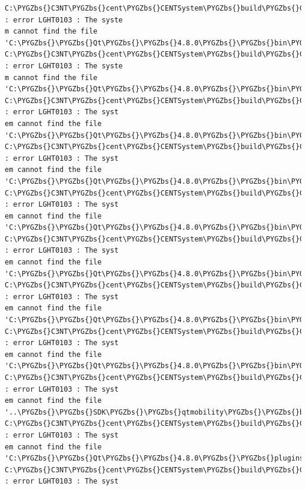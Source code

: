 \documentclass[letterpaper,10pt,english]{sphinxmanual}
\def\PYGZbs{\char`\\}
\begin{document}
\begin{enumerate}
\begin{description}
\begin{Verbatim}[commandchars=\\\{\}]
C:\PYGZbs{}C3NT\PYGZbs{}cent\PYGZbs{}CENTSystem\PYGZbs{}build\PYGZbs{}CENTInstaller.wxs(95) : error LGHT0103 : The syste
m cannot find the file 'C:\PYGZbs{}\PYGZbs{}Qt\PYGZbs{}\PYGZbs{}4.8.0\PYGZbs{}\PYGZbs{}bin\PYGZbs{}\PYGZbs{}QtCore4.dll'.
C:\PYGZbs{}C3NT\PYGZbs{}cent\PYGZbs{}CENTSystem\PYGZbs{}build\PYGZbs{}CENTInstaller.wxs(99) : error LGHT0103 : The syste
m cannot find the file 'C:\PYGZbs{}\PYGZbs{}Qt\PYGZbs{}\PYGZbs{}4.8.0\PYGZbs{}\PYGZbs{}bin\PYGZbs{}\PYGZbs{}QtGui4.dll'.
C:\PYGZbs{}C3NT\PYGZbs{}cent\PYGZbs{}CENTSystem\PYGZbs{}build\PYGZbs{}CENTInstaller.wxs(103) : error LGHT0103 : The syst
em cannot find the file 'C:\PYGZbs{}\PYGZbs{}Qt\PYGZbs{}\PYGZbs{}4.8.0\PYGZbs{}\PYGZbs{}bin\PYGZbs{}\PYGZbs{}QtOpenGL4.dll'.
C:\PYGZbs{}C3NT\PYGZbs{}cent\PYGZbs{}CENTSystem\PYGZbs{}build\PYGZbs{}CENTInstaller.wxs(107) : error LGHT0103 : The syst
em cannot find the file 'C:\PYGZbs{}\PYGZbs{}Qt\PYGZbs{}\PYGZbs{}4.8.0\PYGZbs{}\PYGZbs{}bin\PYGZbs{}\PYGZbs{}QtSvg4.dll'.
C:\PYGZbs{}C3NT\PYGZbs{}cent\PYGZbs{}CENTSystem\PYGZbs{}build\PYGZbs{}CENTInstaller.wxs(111) : error LGHT0103 : The syst
em cannot find the file 'C:\PYGZbs{}\PYGZbs{}Qt\PYGZbs{}\PYGZbs{}4.8.0\PYGZbs{}\PYGZbs{}bin\PYGZbs{}\PYGZbs{}QtWebKit4.dll'.
C:\PYGZbs{}C3NT\PYGZbs{}cent\PYGZbs{}CENTSystem\PYGZbs{}build\PYGZbs{}CENTInstaller.wxs(115) : error LGHT0103 : The syst
em cannot find the file 'C:\PYGZbs{}\PYGZbs{}Qt\PYGZbs{}\PYGZbs{}4.8.0\PYGZbs{}\PYGZbs{}bin\PYGZbs{}\PYGZbs{}phonon4.dll'.
C:\PYGZbs{}C3NT\PYGZbs{}cent\PYGZbs{}CENTSystem\PYGZbs{}build\PYGZbs{}CENTInstaller.wxs(119) : error LGHT0103 : The syst
em cannot find the file 'C:\PYGZbs{}\PYGZbs{}Qt\PYGZbs{}\PYGZbs{}4.8.0\PYGZbs{}\PYGZbs{}bin\PYGZbs{}\PYGZbs{}QtXml4.dll'.
C:\PYGZbs{}C3NT\PYGZbs{}cent\PYGZbs{}CENTSystem\PYGZbs{}build\PYGZbs{}CENTInstaller.wxs(123) : error LGHT0103 : The syst
em cannot find the file 'C:\PYGZbs{}\PYGZbs{}Qt\PYGZbs{}\PYGZbs{}4.8.0\PYGZbs{}\PYGZbs{}bin\PYGZbs{}\PYGZbs{}QtNetwork4.dll'.
C:\PYGZbs{}C3NT\PYGZbs{}cent\PYGZbs{}CENTSystem\PYGZbs{}build\PYGZbs{}CENTInstaller.wxs(127) : error LGHT0103 : The syst
em cannot find the file '..\PYGZbs{}\PYGZbs{}SDK\PYGZbs{}\PYGZbs{}qtmobility\PYGZbs{}\PYGZbs{}bin\PYGZbs{}\PYGZbs{}QtMultimediaKit1.dll'.
C:\PYGZbs{}C3NT\PYGZbs{}cent\PYGZbs{}CENTSystem\PYGZbs{}build\PYGZbs{}CENTInstaller.wxs(133) : error LGHT0103 : The syst
em cannot find the file 'C:\PYGZbs{}\PYGZbs{}Qt\PYGZbs{}\PYGZbs{}4.8.0\PYGZbs{}\PYGZbs{}plugins\PYGZbs{}\PYGZbs{}imageformats\PYGZbs{}qjpeg4.dll'.
C:\PYGZbs{}C3NT\PYGZbs{}cent\PYGZbs{}CENTSystem\PYGZbs{}build\PYGZbs{}CENTInstaller.wxs(140) : error LGHT0103 : The syst

\end{Verbatim}
\end{description}
\end{enumerate}
\end{document}
